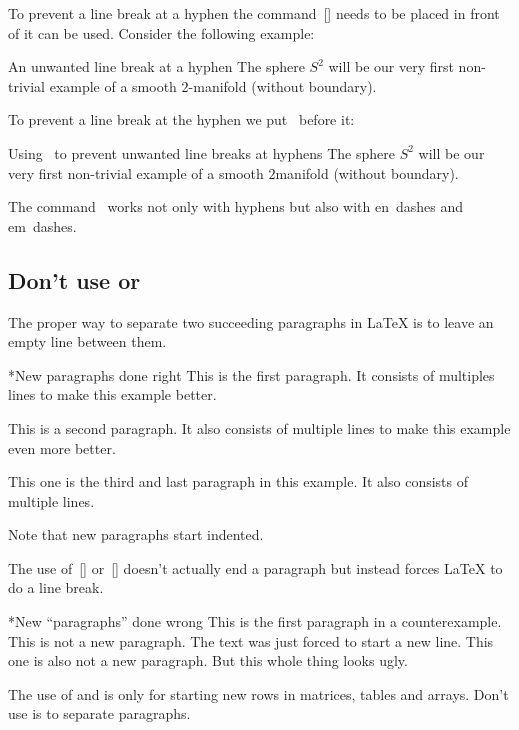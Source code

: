 To prevent a line break at a hyphen the command~[\comname] needs to be placed in front of it can be used.
Consider the following example:
\begin{showlatex}{An unwanted line break at a hyphen}
The sphere $S^2$ will be our very first non-trivial example of a smooth $2$-manifold (without boundary).
\end{showlatex}
To prevent a line break at the hyphen we put~ before it:
\begin{showlatex}{Using~ to prevent unwanted line breaks at hyphens}
The sphere $S^2$ will be our very first non-trivial example of a smooth $2${\nbd}manifold (without boundary).
\end{showlatex}
The command~ works not only with hyphens but also with en~dashes and em~dashes.



\subsection{Don’t use \comtitle{\tbs} or }

The proper way to separate two succeeding paragraphs in {\LaTeX} is to leave an empty line between them.
\begin{showlatex}*{New paragraphs done right}
This is the first paragraph.
It consists of multiples lines to make this example better.

This is a second paragraph.
It also consists of multiple lines to make this example even more better.

This one is the third and last paragraph in this example.
It also consists of multiple lines.
\end{showlatex}
Note that new paragraphs start indented.

The use of~\comname{\tbs}\massindex{\tbs}[\comname] or~[\comname] doesn’t actually end a paragraph but instead forces {\LaTeX} to do a line break.
\begin{showlatex}*{New \enquote{paragraphs} done wrong}
This is the first paragraph in a counterexample.\\
This is not a new paragraph.
The text was just forced to start a new line.\newline
This one is also not a new paragraph.
But this whole thing looks ugly.
\end{showlatex}
The use of \comname{\tbs} and  is only for starting new rows in matrices, tables and arrays.
Don’t use is to separate paragraphs.





